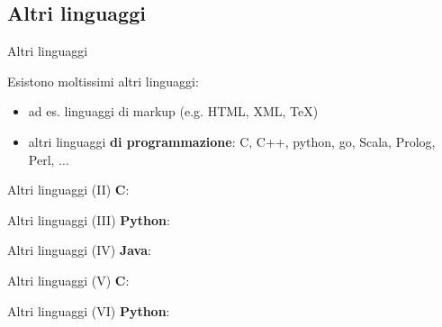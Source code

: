\subsection[Altri linguaggi]{Altri linguaggi}

\begin{frame}{Altri linguaggi}

  Esistono moltissimi altri linguaggi:
  \begin{itemize}
    \item ad es. linguaggi di markup (e.g. HTML, XML, TeX)
    \item altri linguaggi \textbf{di programmazione}: C, C++, python,
  go, Scala, Prolog, Perl, $\dots$

  \end{itemize}
\end{frame}

\begin{frame}{Altri linguaggi (II)}
  \textbf{C}:
  \begin{center}
  \end{center}
\end{frame}

\begin{frame}{Altri linguaggi (III)}
  \textbf{Python}:
  \begin{center}
  \end{center}
\end{frame}

\begin{frame}{Altri linguaggi (IV)}
  \textbf{Java}:
  \begin{center}
  \end{center}
\end{frame}


\begin{frame}{Altri linguaggi (V)}
  \textbf{C}:
  \begin{center}
  \end{center}
\end{frame}

\begin{frame}{Altri linguaggi (VI)}
  \textbf{Python}:
  \begin{center}
  \end{center}
\end{frame}

